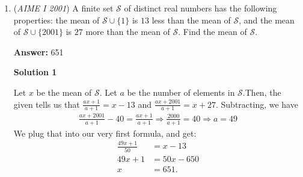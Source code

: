 \begin{enumerate}
 



\textbf{Solution 4}

In this solution, we will do casework on the ones digit.Before we start, let's make some variables. Let $a$ be the ones digit, and $b$ be the tens digit. Let $n$ equal our number. Our number can be expressed as $10b+a$. We can easily see that $b|a$, since $b|n$, and $b|10b$. Therefore, $b|(n-10b)$. Now, let's start with the casework.

 Case 1: $a=1$Since $b|a$, $b=1$. From this, we get that $n=11$ satisfies the condition.

 Case 2: $a=2$We either have $b=1$, or $b=2$. From this, we get that $n=12$ and $n=22$ satisfy the condition.

 Case 3: $a=3$We have $b=3$. From this, we get that $n=33$ satisfies the condition. Note that $b=1$ was not included because $3$ does not divide $13$.

 Case 4: $a=4$We either have $b=2$ or $b=4$. From this, we get that $n=24$ and $n=44$ satisfy the condition. $b=1$ was not included for similar reasons as last time.

 Case 5: $a=5$We either have $b=1$ or $b=5$. From this, we get that $n=15$ and $n=55$ satisfy the condition.

 Continuing with this process up to $a=9$, we get that $n$ could be $11, 12, 22, 33, 24, 44, 15, 55, 36, 66, 77, 48, 88, 99$. Summing, we get that the answer is $\boxed{630}$. A clever way to sum would be to group the multiples of $11$ together to get $11+22+\dots+99=(45)(11)=495$, and then add the remaining $12+24+15+36+48=135$.

 \textit{-bronzetruck2016}

 


	\item (\textit{AIME I 2001}) A finite set $\mathcal{S}$ of distinct real numbers has the following properties: the mean of $\mathcal{S}\cup\{1\}$ is $13$ less than the mean of $\mathcal{S}$, and the mean of $\mathcal{S}\cup\{2001\}$ is $27$ more than the mean of $\mathcal{S}$. Find the mean of $\mathcal{S}$.


 
 \textbf{Answer: }651



\textbf{Solution 1}

Let $x$ be the mean of $\mathcal{S}$. Let $a$ be the number of elements in $\mathcal{S}$.Then, the given tells us that $\frac{ax+1}{a+1}=x-13$ and $\frac{ax+2001}{a+1}=x+27$. Subtracting, we have 
 \begin{align*}\frac{ax+2001}{a+1}-40=\frac{ax+1}{a+1} \Longrightarrow \frac{2000}{a+1}=40 \Longrightarrow a=49\end{align*}
We plug that into our very first formula, and get:
 \begin{align*}\frac{49x+1}{50}&=x-13 \\ 49x+1&=50x-650 \\ x&=\boxed{651}.\end{align*}






\end{enumerate}
